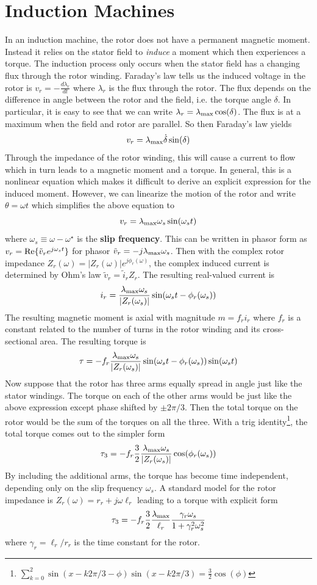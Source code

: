 \documentclass[onecolumn]{gwclass}
\begin{document}
	\section{Induction Machines}
	In an induction machine, the rotor does not have a permanent magnetic moment. Instead it relies on the stator field to \emph{induce} a moment which then experiences a torque. The induction process only occurs when the stator field has a changing flux through the rotor winding. Faraday's law tells us the induced voltage in the rotor is $v_r=-\frac{d\lambda_r}{dt}$ where $\lambda_r$ is the flux through the rotor. The flux depends on the difference in angle between the rotor and the field, i.e. the torque angle $\delta$. In particular, it is easy to see that we can write $\lambda_r=\lambda_{\text{\normalfont{max}}}\cos(\delta)$. The flux is at a maximum when the field and rotor are parallel. So then Faraday's law yields 
	$$ v_r = \lambda_{\text{\normalfont{max}}} \dot{\delta}\sin(\delta)  $$
	Through the impedance of the rotor winding, this will cause a current to flow which in turn leads to a magnetic moment and a torque. In general, this is a nonlinear equation which makes it difficult to derive an explicit expression for the induced moment. However, we can linearize the motion of the rotor and write $\theta=\omega t$ which simplifies the above equation to
	$$ v_r = \lambda_{\text{\normalfont{max}}}\omega_s \sin(\omega_s t) $$
	where $\omega_s\equiv \omega - \omega^\star$ is the \textbf{slip frequency}. This can be written in phasor form as $v_r = \text{\normalfont{Re}}\{\tilde{v}_r e^{j\omega_s t} \}$ for phasor $\tilde{v}_r=-j\lambda_{\text{\normalfont{max}}}\omega_s$. Then with the complex rotor impedance $Z_r(\omega)=|Z_r(\omega)|e^{j\phi_r(\omega)}$, the complex induced current is determined by Ohm's law $\tilde{v}_r=\tilde{i}_rZ_r$. The resulting real-valued current is
	$$ i_r = \frac{\lambda_{\text{\normalfont{max}}}\omega_s}{|Z_r(\omega_s)|}\sin(\omega_s t - \phi_r(\omega_s)) $$
	The resulting magnetic moment is axial with magnitude $m= f_ri_r$ where $f_r$ is a constant related to the number of turns in the rotor winding and its cross-sectional area. The resulting torque is
	$$ \tau = - f_r\frac{\lambda_{\text{\normalfont{max}}}\omega_s}{\abs{Z_r(\omega_s)}}\sin(\omega_s t - \phi_r(\omega_s))\sin(\omega_s t) $$
	Now suppose that the rotor has three arms equally spread in angle just like the stator windings. The torque on each of the other arms would be just like the above expression except phase shifted by $\pm 2\pi/3$. Then the total torque on the rotor would be the sum of the torques on all the three. With a trig identity\footnote{$\sum_{k=0}^2\sin(x-k2\pi/3-\phi)\sin(x-k2\pi/3)=\frac{3}{2}\cos(\phi)$}, the total torque comes out to the simpler form
	$$ \tau_3 = - f_r\frac{3}{2}\frac{\lambda_{\text{\normalfont{max}}}\omega_s}{\abs{Z_r(\omega_s)}}\cos(\phi_r(\omega_s)) $$
	By including the additional arms, the torque has become time independent, depending only on the slip frequency $\omega_s$. A standard model for the rotor impedance is $Z_r(\omega)=r_r + j\omega \ell_r$ leading to a torque with explicit form
	$$ \tau_3 = -f_r\frac{3}{2}\frac{\lambda_{\text{\normalfont{max}}}}{\ell_r}\frac{\gamma_r\omega_s}{1 + \gamma_r^2\omega_s^2} $$
	where $\gamma_r = \ell_r/r_r$ is the time constant for the rotor.
	
\end{document}
